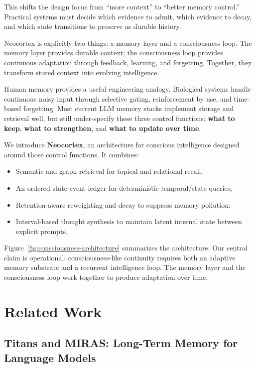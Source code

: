 \documentclass{article}
\begin{document}
This shifts the design focus from ``more context'' to ``better memory
control.'' Practical systems must decide which evidence to admit, which
evidence to decay, and which state transitions to preserve as durable
history.

Neocortex is explicitly two things: a memory layer and a consciousness loop.
The memory layer provides durable context; the consciousness loop provides
continuous adaptation through feedback, learning, and forgetting. Together,
they transform stored context into evolving intelligence.

Human memory provides a useful engineering analogy. Biological systems handle
continuous noisy input through selective gating, reinforcement by use, and
time-based forgetting. Most current LLM memory stacks implement storage and
retrieval well, but still under-specify these three control functions:
\textbf{what to keep}, \textbf{what to strengthen}, and
\textbf{what to update over time}.

We introduce \textbf{Neocortex}, an architecture for conscious
intelligence designed around those control functions. It combines:
\begin{itemize}
\item Semantic and graph retrieval for topical and relational recall;
\item An ordered state-event ledger for deterministic temporal/state queries;
\item Retention-aware reweighting and decay to suppress memory pollution;
\item Interval-based thought synthesis to maintain latent internal state
between explicit prompts.
\end{itemize}

Figure~\ref{fig:consciousness-architecture} summarizes the architecture.
Our central claim is operational: consciousness-like continuity requires both
an adaptive memory substrate and a recurrent intelligence loop. The memory
layer and the consciousness loop work together to produce adaptation over time.

\section{Related Work}

\subsection{Titans and MIRAS: Long-Term Memory for Language Models}
\end{document}
